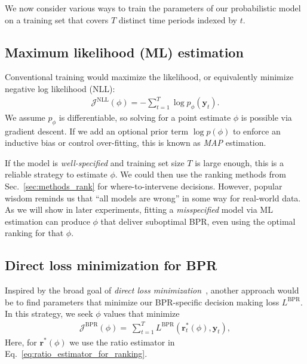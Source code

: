 We now consider various ways to train the parameters of our probabilistic model on a training set that covers $T$ distinct time periods indexed by $t$.


\subsection{Maximum likelihood (ML) estimation}
Conventional training would maximize the likelihood, or equivalently minimize negative log likelihood (NLL):
\begin{align}
    \mathcal{J}^{\text{NLL}}(\phi) = 
    - \textstyle \sum_{t=1}^T \log p_{\phi}( \bm{y}_t ).
    \label{eq:ml_obj}
\end{align}
We assume $p_{\phi}$ is differentiable, so solving for a point estimate $\phi$ is possible via gradient descent. 
If we add an optional prior term $\log p(\phi)$ to enforce an inductive bias or control over-fitting, this is known as \emph{MAP} estimation.

If the model is \emph{well-specified} and training set size $T$ is large enough, this is a reliable strategy to estimate $\phi$. We could then use the ranking methods from Sec.~\ref{sec:methods_rank} for where-to-intervene decisions. However, popular wisdom reminds us that ``all models are wrong'' in some way for real-world data. As we will show in later experiments, fitting a \emph{misspecified} model via ML estimation can produce $\phi$ that deliver suboptimal BPR, even using the optimal ranking for that $\phi$.

\subsection{Direct loss minimization for BPR}

Inspired by the broad goal of \emph{direct loss minimization}~\citep{weiDirectLoss2021}, another approach would be to find parameters that minimize our BPR-specific decision making loss $L^{\text{BPR}}$. In this strategy, we seek $\phi$ values that minimize
\begin{align}
    \mathcal{J}^{\text{BPR}}(\phi) =
    ~ \textstyle \sum_{t=1}^T L^{\text{BPR}}( \bm{r}^*_t(\phi),  \bm{y}_t ),
    \label{eq:dlm_obj}
\end{align}
Here, for $\bm{r}^*(\phi)$ we use the ratio estimator in Eq.~\eqref{eq:ratio_estimator_for_ranking}. 

